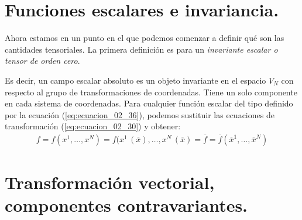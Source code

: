 \section{Funciones escalares e invariancia.}

Ahora estamos en un punto en el que podemos comenzar a definir qué son las cantidades tensoriales. La primera definición es para un \emph{invariante escalar o tensor de orden cero}.

\begin{center}
\noindent{}
\end{center}
\par
Es decir, un campo escalar absoluto es un objeto invariante en el espacio $V_{N}$ con respecto al grupo de transformaciones de coordenadas. Tiene un solo componente en cada sistema de coordenadas. Para cualquier función escalar del tipo definido por la ecuación (\ref{eq:ecuacion_02_36}), podemos sustituir las ecuaciones de transformación (\ref{eq:ecuacion_02_30}) y obtener:
\begin{align}
f = f (x^{1}, \ldots, x^{N}) = f (x^{1} \, (\overline{x}), \ldots, x^{N} \, (\overline{x}) = \overline{f} = \overline{f} (\overline{x}^{1}, \ldots, \overline{x}^{N})
\label{eq:ecuacion_02_38}
\end{align}

\section{Transformación vectorial, componentes contravariantes.}

